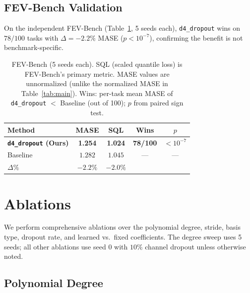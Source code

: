 \documentclass{article}
\begin{document}
\subsection{FEV-Bench Validation}

On the independent FEV-Bench (Table~\ref{tab:fev-main}, 5 seeds each), \texttt{d4\_dropout} wins on $78/100$ tasks with $\Delta = -2.2\%$ MASE ($p < 10^{-7}$), confirming the benefit is not benchmark-specific.

\begin{table}[t]
\caption{FEV-Bench (5 seeds each). SQL (scaled quantile loss) is FEV-Bench's primary metric. MASE values are unnormalized (unlike the normalized MASE in Table~\ref{tab:main}). Wins: per-task mean MASE of \texttt{d4\_dropout} $<$ Baseline (out of 100); $p$ from paired sign test.}
\label{tab:fev-main}
\vskip 0.05in
\centering
\setlength{\tabcolsep}{4pt}
\small
\begin{tabular}{lcccc}
\toprule
\textbf{Method} & \textbf{MASE} & \textbf{SQL} & \textbf{Wins} & \textbf{$p$} \\
\midrule
\textbf{\texttt{d4\_dropout} (Ours)} & \textbf{1.254} & \textbf{1.024} & \textbf{78/100} & $< 10^{-7}$ \\
Baseline                             & $1.282$        & $1.045$        & ---             & --- \\
$\Delta\%$                           & $-2.2\%$       & $-2.0\%$       &                 &  \\
\bottomrule
\end{tabular}
\vskip -0.1in
\end{table}

\section{Ablations}
\label{sec:ablations}

We perform comprehensive ablations over the polynomial degree, stride, basis type, dropout rate, and learned vs.\ fixed coefficients. The degree sweep uses 5 seeds; all other ablations use seed 0 with $10\%$ channel dropout unless otherwise noted.

\subsection{Polynomial Degree}
\end{document}
